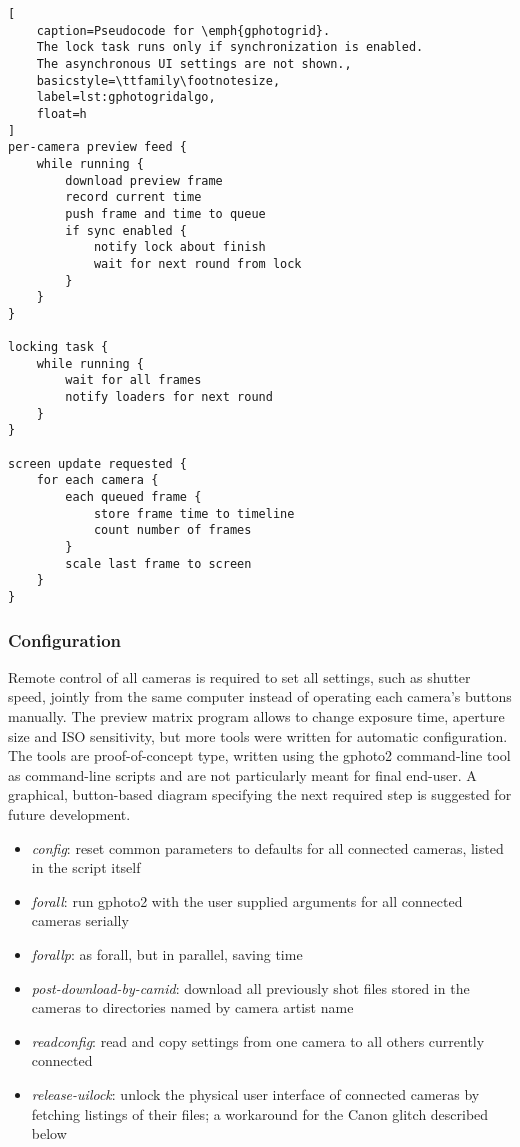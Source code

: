\begin{lstlisting}[
	caption=Pseudocode for \emph{gphotogrid}.
	The lock task runs only if synchronization is enabled.
	The asynchronous UI settings are not shown.,
	basicstyle=\ttfamily\footnotesize,
	label=lst:gphotogridalgo,
	float=h
]
per-camera preview feed {
	while running {
		download preview frame
		record current time
		push frame and time to queue
		if sync enabled {
			notify lock about finish
			wait for next round from lock
		}
	}
}

locking task {
	while running {
		wait for all frames
		notify loaders for next round
	}
}

screen update requested {
	for each camera {
		each queued frame {
			store frame time to timeline
			count number of frames
		}
		scale last frame to screen
	}
}
\end{lstlisting}

\subsubsection{Configuration} %

Remote control of all cameras is required to set all settings, such as shutter speed, jointly from the same computer instead of operating each camera's buttons manually.
The preview matrix program allows to change exposure time, aperture size and ISO sensitivity, but more tools were written for automatic configuration.
The tools are proof-of-concept type, written using the gphoto2 command-line tool as command-line scripts and are not particularly meant for final end-user.
A graphical, button-based diagram specifying the next required step is suggested for future development.

\begin{itemize}
	\item \emph{config}: reset common parameters to defaults for all connected cameras, listed in the script itself
	\item \emph{forall}: run gphoto2 with the user supplied arguments for all connected cameras serially
	\item \emph{forallp}: as forall, but in parallel, saving time
	\item \emph{post-download-by-camid}: download all previously shot files stored in the cameras to directories named by camera artist name
	\item \emph{readconfig}: read and copy settings from one camera to all others currently connected
	\item \emph{release-uilock}: unlock the physical user interface of connected cameras by fetching listings of their files; a workaround for the Canon glitch described below
\end{itemize}

